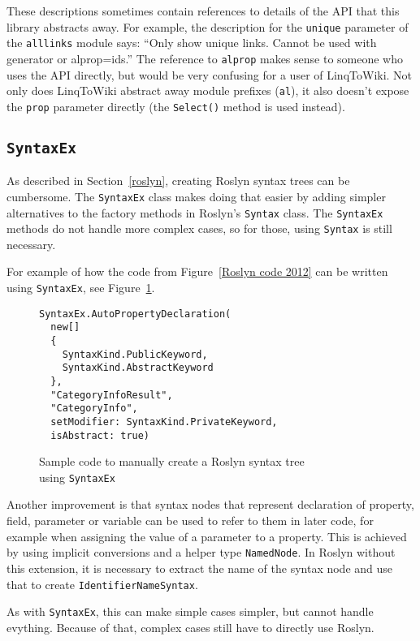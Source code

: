 These descriptions sometimes contain references to details of the API that this library abstracts away.
For example, the description for the \texttt{unique} parameter of the \lstinline{alllinks} module says:
“Only show unique links. Cannot be used with generator or alprop=ids.”
The reference to \texttt{alprop} makes sense to someone who uses the API directly,
but would be very confusing for a user of LinqToWiki.
Not only does LinqToWiki abstract away module prefixes (\texttt{al}),
it also doesn't expose the \texttt{prop} parameter directly
(the \lstinline{Select()} method is used instead).

\subsection{\texorpdfstring{\lstinline{SyntaxEx}}{SyntaxEx}}

As described in Section~\ref{roslyn}, creating Roslyn syntax trees can be cumbersome.
The \lstinline{SyntaxEx} class makes doing that easier by adding simpler alternatives
to the factory methods in Roslyn's \lstinline{Syntax} class.
The \lstinline{SyntaxEx} methods do not handle more complex cases,
so for those, using \lstinline{Syntax} is still necessary.

For example of how the code from Figure~\ref{Roslyn code 2012} can be written using \lstinline{SyntaxEx},
see Figure~\ref{SyntaxEx code}.

\begin{figure}[htbp]

\begin{lstlisting}
SyntaxEx.AutoPropertyDeclaration(
  new[]
  {
    SyntaxKind.PublicKeyword,
    SyntaxKind.AbstractKeyword
  },
  "CategoryInfoResult",
  "CategoryInfo",
  setModifier: SyntaxKind.PrivateKeyword,
  isAbstract: true)
\end{lstlisting}

\caption{Sample code to manually create a Roslyn syntax tree \\ using \lstinline{SyntaxEx}}
\label{SyntaxEx code}
\end{figure}

\medskip

Another improvement is that syntax nodes that represent declaration of property, field, parameter or variable
can be used to refer to them in later code, for example when assigning the value of a parameter to a property.
This is achieved by using implicit conversions and a helper type \lstinline{NamedNode}.
In Roslyn without this extension, it is necessary to extract the name of the syntax node
and use that to create \lstinline{IdentifierNameSyntax}.

As with \lstinline{SyntaxEx}, this can make simple cases simpler, but cannot handle evything.
Because of that, complex cases still have to directly use Roslyn.